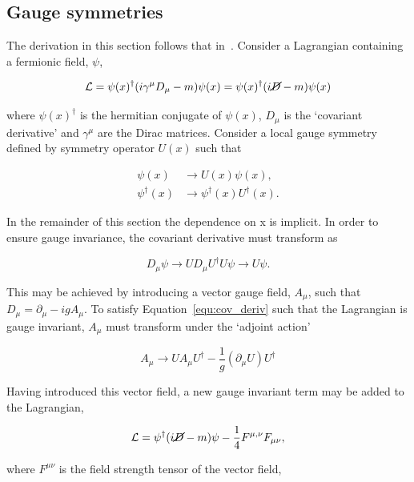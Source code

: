 \subsection{Gauge symmetries}

The derivation in this section follows that in~\cite{ewk-int}. Consider a Lagrangian containing a fermionic field, $\psi$,

\begin{equation}
\mathcal{L} = \psi(x)^{\dagger} (i\gamma^{\mu}D_{\mu} - m)\psi(x) = \psi(x)^{\dagger} (i\cancel{D} - m)\psi(x)
\end{equation}

where $\psi(x)^{\dagger}$ is the hermitian conjugate of $\psi(x)$, $D_{\mu}$ is the `covariant derivative' and
$\gamma^{\mu}$ are the Dirac matrices. Consider a local gauge symmetry defined by symmetry operator $U(x)$ such that

\begin{align}
\psi(x) &\rightarrow U(x)\psi(x), \\
\psi^{\dagger}(x) &\rightarrow \psi^{\dagger} (x) U^{\dagger} (x).
\end{align}

In the remainder of this section the dependence on x is implicit. In order to ensure gauge invariance, the 
covariant derivative must transform as 

\begin{equation}
\label{equ:cov_deriv}
D_{\mu}\psi \rightarrow U D_{\mu}U^{\dagger} U \psi \rightarrow U \psi.
\end{equation}

This may be achieved by introducing a vector gauge field, $A_\mu$, such that 
$D_{\mu} = \partial_{\mu} - igA_{\mu}$. To satisfy Equation~\ref{equ:cov_deriv}
such that the Lagrangian is gauge invariant, $A_{\mu}$ must transform
under the `adjoint action'

\begin{equation}
A_{\mu} \rightarrow U A_{\mu} U^{\dagger} - \frac{1}{g}(\partial_{\mu}U)U^{\dagger}
\end{equation}

Having introduced this vector field, a new gauge invariant term may be added to the Lagrangian,

\begin{equation}
\mathcal{L} = \psi^{\dagger} (i\cancel{D} - m)\psi - \frac{1}{4}F^{\mu,\nu}F_{\mu\nu},
\end{equation}

where $F^{\mu\nu}$ is the field strength tensor of the vector field,

